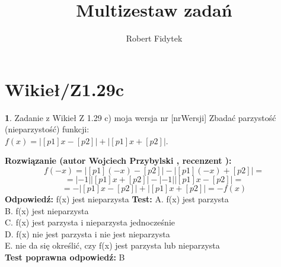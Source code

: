 \documentclass[12pt, a4paper]{article}
\title{Multizestaw zadań}
\author{Robert Fidytek}
\date{}
\theoremstyle{definition} %
\newtheorem{zad}{}
\newcommand{\kategoria}[1]{\section{#1}} %
\newcommand{\zadStart}[1]{\begin{zad}#1\newline} %
\newcommand{\zadStop}{\end{zad}}   %
\newcommand{\rozwStart}[2]{\noindent \textbf{Rozwiązanie (autor #1 , recenzent #2): }\newline} %
\newcommand{\rozwStop}{\newline}                                            %
\newcommand{\odpStart}{\noindent \textbf{Odpowiedź:}\newline}    %
\newcommand{\odpStop}{\newline}                                             %
\newcommand{\testStart}{\noindent \textbf{Test:}\newline} %
\newcommand{\testStop}{\newline} %
\newcommand{\kluczStart}{\noindent \textbf{Test poprawna odpowiedź:}\newline} %
\newcommand{\kluczStop}{\newline} %
\begin{document}
\maketitle


\kategoria{Wikieł/Z1.29c}
\zadStart{Zadanie z Wikieł Z 1.29 c) moja wersja nr [nrWersji]}
Zbadać parzystość (nieparzystość) funkcji:\\ $ f(x)=|[p1]x-[p2]|+|[p1]x+[p2]|$.
\zadStop
\rozwStart{Wojciech Przybylski}{}
$$f(-x)=|[p1](-x)-[p2]|-|[p1](-x)+[p2]|=$$
$$=|-1||[p1]x+[p2]|-|-1||[p1]x-[p2]|=$$
$$=-|[p1]x-[p2]|+|[p1]x+[p2]|=-f(x)$$
\rozwStop
\odpStart
f(x) jest nieparzysta
\odpStop
\testStart
A. f(x) jest parzysta\\
B. f(x) jest nieparzysta\\
C. f(x) jest parzysta i nieparzysta jednocześnie\\
D. f(x) nie jest parzysta i nie jest nieparzysta\\
E. nie da się określić, czy f(x) jest parzysta lub nieparzysta\\
\testStop
\kluczStart
B
\kluczStop
\end{document}
